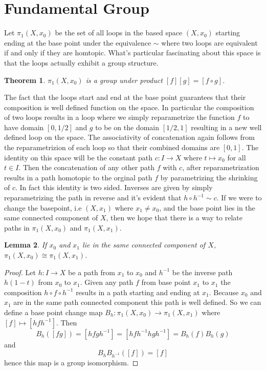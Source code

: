 \documentclass[40pt]{article}
\newtheorem{theorem}{Theorem}[section]
\newtheorem{lemma}[theorem]{Lemma}
\begin{document}
		\section{Fundamental Group}
		Let $\pi_1(X,x_0)$ be the set of all loops in the based space $(X,x_0)$ starting ending at the base point under the equivalence $\sim$ where two loops are equivalent if and only if they are homtopic. What's particular fascinating about this space is that the loops actually exhibit a group structure. 
		\begin{theorem}
			$\pi_1(X,x_0) $ is a group under product $[f][g] = [f\circ g]$. 
		\end{theorem}
		The fact that the loops start and end at the base point guarantees that their composition is well defined function on the space. In particular the composition of two loops results in a loop where we simply reparametrize the function $f$ to have domain $[0,1/2]$ and $g$ to be on the domain $[1/2, 1]$ resulting in a new well defined loop on the space. The associativity of concatenation again follows from the reparametrizion of each loop so that their combined domains are $[0,1]$. The identity on this space will be the constant path $c: I \rightarrow X$ where $t \mapsto x_0$ for all $t \in I$. Then the concatenation of any other path $f$ with $c$, after reparametrization results in a path homotopic to the orginal path $f$ by parametrizing the shrinking of $c$. In fact this identity is two sided. Inverses are given by simply reparametrizing the path in reverse and it's evident that $h \circ h^{-1} \sim c$. If we were to change the basepoint, i.e $(X, x_1)$ where $x_1 \neq x_0$, and the base point lies in the same connected component of $X$, then we hope that there is a way to relate paths in $\pi_1(X,x_0)$ and $\pi_1(X,x_1)$. 
		\begin{lemma}
			If $x_0$ and $x_1$ lie in the same connected component of $X$, $\pi_1(X,x_0) \cong \pi_1(X,x_1)$. 
		\end{lemma}
		\begin{proof}
			Let $h: I \rightarrow X$ be a path from $x_1$ to $x_0$ and $h^{-1}$ be the inverse path $h(1-t)$ from $x_0$ to $x_1$. Given any path $f$ from base point $x_1$ to $x_1$ the composition $h \circ f \circ h^{-1}$ results in a path starting and ending at $x_1$. Because $x_0$ and $x_1$ are in the same path connected component this path is well defined. So we can define a base point change map $B_h : \pi_1(X,x_0) \rightarrow \pi_1(X,x_1)$ where $[f] \mapsto [hfh^{-1}]$. Then 
			\[
			B_h([fg]) = [hfgh^{-1}] = [hfh^{-1}hgh^{-1}]=B_h(f)B_h(g)
			\]
			and 
			\[
			B_hB_{h^{-1}}([f]) = [f]
			\]
			hence this map is a group isomorphism. 
		\end{proof}
\end{document}
